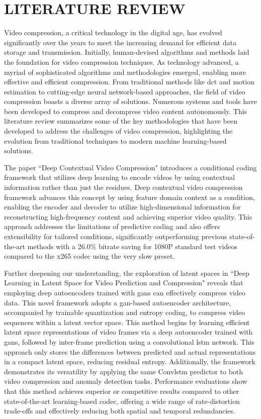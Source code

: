 \documentclass{ioereport}
\begin{document}
\section{\MakeUppercase{Literature Review}}
Video compression, a critical technology in the digital age, has evolved significantly over the years to meet the increasing demand for efficient data storage and transmission. Initially, human-devised algorithms and methods laid the foundation for video compression techniques. As technology advanced, a myriad of sophisticated algorithms and methodologies emerged, enabling more effective and efficient compression. From traditional methods like \gls{dct} and motion estimation to cutting-edge neural network-based approaches, the field of video compression boasts a diverse array of solutions. Numerous systems and tools have been developed to compress and decompress video content autonomously. This literature review summarizes some of the key methodologies that have been developed to address the challenges of video compression, highlighting the evolution from traditional techniques to modern machine learning-based solutions.

The paper ``Deep Contextual Video Compression" \cite{li2021deep} introduces a conditional coding framework that utilizes deep learning to encode videos by using contextual information rather than just the residues. Deep contextual video compression framework advances this concept by using feature domain context as a condition, enabling the encoder and decoder to utilize high-dimensional information for reconstructing high-frequency content and achieving superior video quality. This approach addresses the limitations of predictive coding and also offers extensibility for tailored conditions, significantly outperforming previous state-of-the-art methods with a 26.0\% bitrate saving for 1080P standard test videos compared to the x265 \gls{codec} using the very slow preset.

Further deepening our understanding, the exploration of latent spaces in ``Deep Learning in Latent Space for Video Prediction and Compression" \cite{Liu_latentvideo} reveals that employing deep autoencoders trained with \gls{gan}s can effectively compress video data. This novel framework adopts a \gls{gan}-based autoencoder architecture, accompanied by trainable quantization and entropy coding, to compress video sequences within a latent vector space. This method begins by learning efficient latent space representations of video frames via a deep autoencoder trained with \gls{gan}s, followed by inter-frame prediction using a convolutional \gls{lstm} network. This approach only stores the differences between predicted and actual representations in a compact latent space, reducing residual entropy. Additionally, the framework demonstrates its versatility by applying the same Conv\gls{lstm} predictor to both video compression and anomaly detection tasks. Performance evaluations show that this method achieves superior or competitive results compared to other state-of-the-art learning-based \gls{codec}, offering a wide range of rate-distortion trade-offs and effectively reducing both spatial and temporal redundancies.
\end{document}
